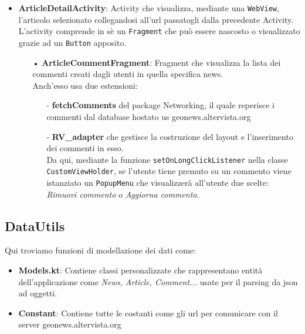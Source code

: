 \documentclass[12pt]{article}
\def\code#1{\texttt{#1}}
\begin{document}
\begin{itemize}
\item\textbf{ArticleDetailActivity}: Activity che visualizza, mediante una \code{WebView}, l'articolo selezionato collegandosi all'url passatogli dalla precedente Activity.\\
L'activity comprende in sè un \code{Fragment} che può essere nascosto o visualizzato grazie ad un \code{Button} apposito.
\begin{itemize}
\item[•]\textbf{ArticleCommentFragment}: Fragment che  visualizza la lista dei commenti creati dagli utenti in quella specifica news.\\
Anch'esso usa due estensioni:
\begin{itemize}
\item[-]\textbf{fetchComments} del package Networking, il quale reperisce i commenti dal database hostato us geonews.altervista.org
\item[-]\textbf{RV\_adapter} che gestisce la costruzione del layout e l'inserimento dei commenti in esso.\\
Da qui, mediante la funzione \code{setOnLongClickListener} nella classe \code{CustomViewHolder}, se l'utente tiene premuto su un commento viene istanziato un \code{PopupMenu} che visualizzerà all'utente due scelte: \textit{Rimuovi commento }o \textit{Aggiorna commento}.
\end{itemize}
\end{itemize}
\end{itemize}
\subsection{DataUtils}
Qui troviamo funzioni di modellazione dei dati come:
\begin{itemize}
\item\textbf{Models.kt}: Contiene classi personalizzate che rappresentano entità dell'applicazione come \textit{News, Article, Comment...} usate per il parsing da json ad oggetti.
\item\textbf{Constant}: Contiene tutte le costanti come gli url per comunicare con il server geonews.altervista.org
\end{itemize}

\newpage
\end{document}
